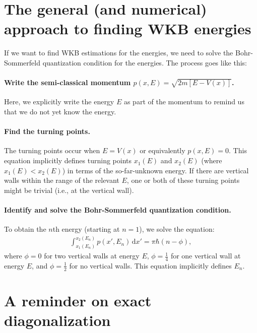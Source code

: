 \documentclass[10pt]{article}
\newcommand{\1}{\mathbf 1}
\begin{document}
\section*{The general (and numerical) approach to finding WKB energies}

If we want to find WKB estimations for the energies, we need to solve the Bohr-Sommerfeld quantization condition for the energies.
The process goes like this:

\paragraph{Write the semi-classical momentum $p(x,E) = \sqrt{2m[E - V(x)]}$.}
Here, we explicitly write the energy $E$ as part of the momentum to remind us that we do not yet know the energy.

\paragraph{Find the turning points.}
The turning points occur when $E = V(x)$ or equivalently $p(x,E) = 0$.
This equation implicitly defines turning points $x_1(E)$ and $x_2(E)$ (where $x_1(E) < x_2(E)$) in terms of the so-far-unknown energy.
If there are vertical walls within the range of the relevant $E$, one or both of these turning points might be trivial (i.e., at the vertical wall).

\paragraph{Identify and solve the Bohr-Sommerfeld quantization condition.}
To obtain the $n$th energy (starting at $n=1$), we solve the equation:
\begin{align}
	\int_{x_1(E_n)}^{x_2(E_n)}
	p(x',E_n) \,\mathrm{d} x'
	=
	\pi \hbar (n - \phi),
\end{align}
where $\phi = 0$ for two vertical walls at energy $E$, $\phi = \frac{1}{4}$ for one vertical wall at energy $E$, and $\phi = \frac{1}{2}$ for no vertical walls.
This equation implicitly defines $E_n$.


\section*{A reminder on exact diagonalization}
\end{document}
